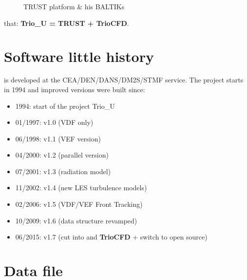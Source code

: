 \begin{figure}[h!]
\begin{center}
\caption{TRUST platform \& his BALTIKs}
\label{TRUST}
\end{center}
\end{figure}

\Note that: \textbf{Trio\_U = TRUST + TrioCFD}.



\section{Software little history}

\trust is developed at the CEA/DEN/DANS/DM2S/STMF service.
The project starts in 1994 and improved versions were built since:
\begin{itemize}
\item 1994: start of the project Trio\_U
\item 01/1997: v1.0 (VDF only)
\item 06/1998: v1.1 (VEF version)
\item 04/2000: v1.2 (parallel version)
\item 07/2001: v1.3 (radiation model)
\item 11/2002: v1.4 (new LES turbulence models)
\item 02/2006: v1.5 (VDF/VEF Front Tracking)
\item 10/2009: v1.6 (data structure revamped)
\item 06/2015: v1.7 (cut into \trust and \textbf{TrioCFD} + switch to open source)
\end{itemize}




\section{Data file}

